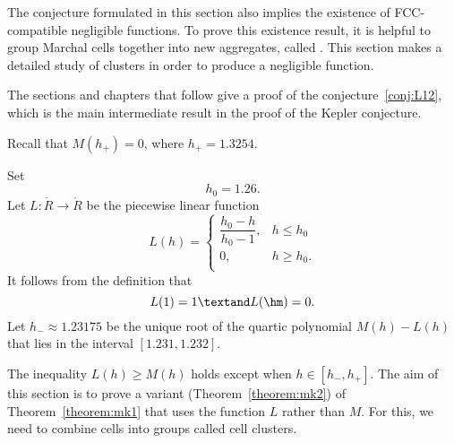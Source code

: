The conjecture formulated in this section also implies the existence
of FCC-compatible negligible functions.  To prove this existence
result, it is helpful to group Marchal cells together into new
aggregates, called .  This section makes a detailed
study of clusters in order to produce a negligible function.

The sections and chapters that follow give a proof of the
conjecture~\ref{conj:L12},  which is the
main intermediate result in the proof of the Kepler
conjecture.


Recall that $M(h_+) = 0$, where   $h_+ = 1.3254$.
%

\begin{definition}[$L$,~$h_0$,~$h_-$]\label{def:L} 
Set
\[  
h_0 = 1.26.%
\] 
Let $L:\ring{R}\to\ring{R}$ be the piecewise linear function 
\[  
L(h) = \begin{cases} 
\dfrac{h_0-h}{h_0-1}, & h \le h_0 \\
0, & h\ge h_0. \\
\end{cases}
\] 
It follows from the definition that
\[  
L(1) = 1\textand  L(\hm) = 0.
\] 
Let $h_- \approx 1.23175$ be the unique root of the quartic polynomial
$M(h)-L(h)$ that lies in the interval $[1.231,1.232]$.
%
%
%
\end{definition}

\figBJLIEKB %


The inequality $L(h)\ge M(h)$ holds except when $h\in [h_-,h_+]$.  The
aim of this section is to prove a variant (Theorem~\ref{theorem:mk2})
of Theorem~\ref{theorem:mk1} that uses the function $L$ rather than
$M$.  For this, we need to combine cells into groups called cell
clusters.


